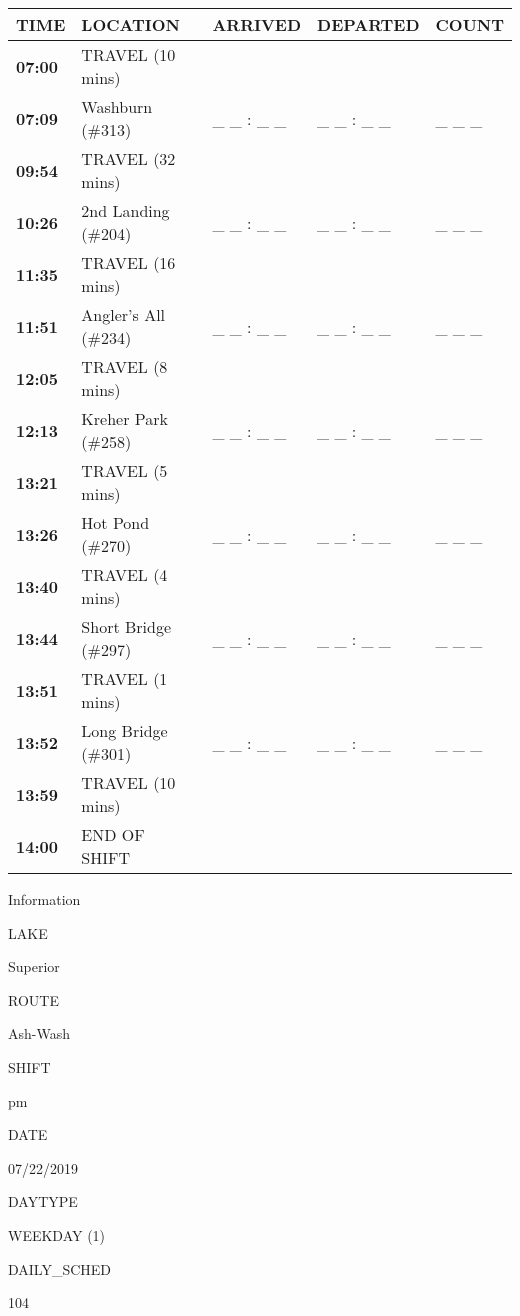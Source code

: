 \documentclass[]{article}
\begin{document}
\begin{tabular}{>{\bfseries}lllll}
\toprule
\textbf{TIME} & \textbf{LOCATION} & \textbf{ARRIVED} & \textbf{DEPARTED} & \textbf{COUNT}\\
\midrule
07:00 & TRAVEL (10 mins) &  &  & \\
07:09 & Washburn (\#313) & \_ \_ : \_ \_ & \_ \_ : \_ \_ & \_ \_ \_\\
09:54 & TRAVEL (32 mins) &  &  & \\
10:26 & 2nd Landing (\#204) & \_ \_ : \_ \_ & \_ \_ : \_ \_ & \_ \_ \_\\
11:35 & TRAVEL (16 mins) &  &  & \\
11:51 & Angler's All (\#234) & \_ \_ : \_ \_ & \_ \_ : \_ \_ & \_ \_ \_\\
12:05 & TRAVEL (8 mins) &  &  & \\
12:13 & Kreher Park (\#258) & \_ \_ : \_ \_ & \_ \_ : \_ \_ & \_ \_ \_\\
13:21 & TRAVEL (5 mins) &  &  & \\
13:26 & Hot Pond (\#270) & \_ \_ : \_ \_ & \_ \_ : \_ \_ & \_ \_ \_\\
13:40 & TRAVEL (4 mins) &  &  & \\
13:44 & Short Bridge (\#297) & \_ \_ : \_ \_ & \_ \_ : \_ \_ & \_ \_ \_\\
13:51 & TRAVEL (1 mins) &  &  & \\
13:52 & Long Bridge (\#301) & \_ \_ : \_ \_ & \_ \_ : \_ \_ & \_ \_ \_\\
13:59 & TRAVEL (10 mins) &  &  & \\
14:00 & END OF SHIFT &  &  & \\
\bottomrule
\end{tabular}\newpage

Information

LAKE

Superior

ROUTE

Ash-Wash

SHIFT

pm

DATE

07/22/2019

DAYTYPE

WEEKDAY (1)

DAILY\_SCHED

104

\vspace{24pt}
\end{document}
